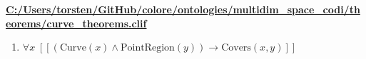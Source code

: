 \documentclass{article}
\begin{document}
\textbf{\url{C:/Users/torsten/GitHub/colore/ontologies/multidim\_space\_codi/theorems/curve\_theorems.clif}}

\begin{enumerate}
\item $\forall x\;  \left[ \left[ \left(\textrm{Curve}(x) \land \textrm{PointRegion}(y)\right) \rightarrow \textrm{Covers}(x,y) \right] \right]$
\end{enumerate}
\end{document}
